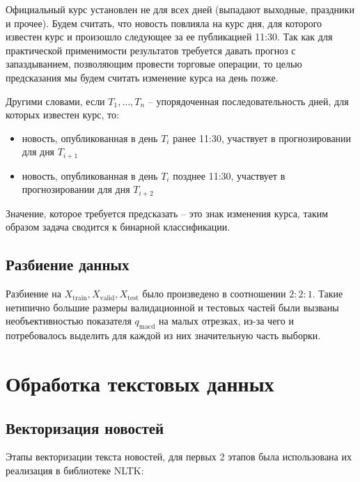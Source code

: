 \documentclass[pdftex,14pt,a4paper]{extreport}
\begin{document}
Официальный курс установлен не для всех дней (выпадают выходные, праздники и прочее).
Будем считать, что новость повлияла на курс дня, для которого известен курс и произошло следующее за ее публикацией 11:30.
Так как для практической применимости результатов требуется давать прогноз с запаздыванием, позволяющим провести торговые операции,
то целью предсказания мы будем считать изменение курса на день позже.

Другими словами, если $T_1,\ldots,T_n$ -- упорядоченная последовательность дней, для которых известен курс, то:
\begin{itemize}
\item новость, опубликованная в день $T_i$ ранее 11:30, участвует в прогнозировании для дня $T_{i+1}$
\item новость, опубликованная в день $T_i$ позднее 11:30, участвует в прогнозировании для дня $T_{i+2}$
\end{itemize}

Значение, которое требуется предсказать -- это знак изменения курса, таким образом задача сводится к бинарной классификации.

\subsection{Разбиение данных}

Разбиение на $X_\text{train}, X_\text{valid}, X_\text{test}$ было произведено в соотношении $2:2:1$.
Такие нетипично большие размеры валидационной и тестовых частей были вызваны необъективностью показателя
$q_\text{macd}$ на малых отрезках, из-за чего и потребовалось выделить для каждой из них значительную часть выборки.

\section{Обработка текстовых данных}

\subsection{Векторизация новостей}

Этапы векторизации текста новостей, для первых 2 этапов была использована их реализация в библиотеке NLTK\cite{nltk}:
\end{document}
